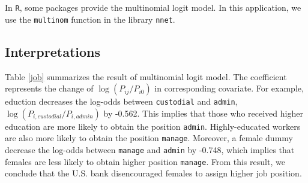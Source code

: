 \documentclass[
  12pt,
]{article}
\newenvironment{Shaded}{\begin{snugshade}}{\end{snugshade}}
\newcommand{\CommentTok}[1]{\textcolor[rgb]{0.56,0.35,0.01}{\textit{#1}}}
\newcommand{\DataTypeTok}[1]{\textcolor[rgb]{0.13,0.29,0.53}{#1}}
\newcommand{\DecValTok}[1]{\textcolor[rgb]{0.00,0.00,0.81}{#1}}
\newcommand{\KeywordTok}[1]{\textcolor[rgb]{0.13,0.29,0.53}{\textbf{#1}}}
\newcommand{\NormalTok}[1]{#1}
\newcommand{\OperatorTok}[1]{\textcolor[rgb]{0.81,0.36,0.00}{\textbf{#1}}}
\newcommand{\StringTok}[1]{\textcolor[rgb]{0.31,0.60,0.02}{#1}}
\begin{document}
In \texttt{R}, some packages provide the multinomial logit model. In
this application, we use the \texttt{multinom} function in the library
\texttt{nnet}.

\begin{Shaded}
\end{Shaded}

\hypertarget{interpretations}{%
\subsection{Interpretations}\label{interpretations}}

Table \ref{job} summarizes the result of multinomial logit model. The
coefficient represents the change of \(\log(P_{ij}/P_{i0})\) in
corresponding covariate. For example, eduction decreases the log-odds
between \texttt{custodial} and \texttt{admin},
\(\log(P_{i, custodial}/P_{i, admin})\) by -0.562. This implies that
those who received higher education are more likely to obtain the
position \texttt{admin}. Highly-educated workers are also more likely to
obtain the position \texttt{manage}. Moreover, a female dummy decrease
the log-odds between \texttt{manage} and \texttt{admin} by -0.748, which
implies that females are less likely to obtain higher position
\texttt{manage}. From this result, we conclude that the U.S. bank
disencouraged females to assign higher job position.
\end{document}
